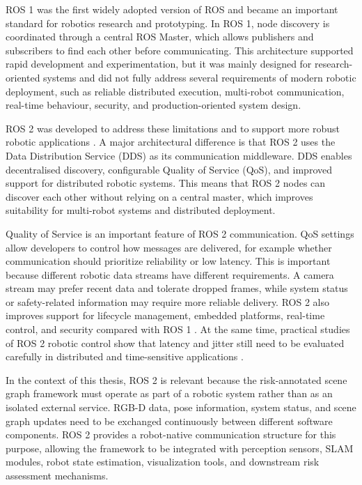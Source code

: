 {\small

ROS 1 was the first widely adopted version of ROS and became an important standard for robotics research and prototyping. In ROS 1, node discovery is coordinated through a central ROS Master, which allows publishers and subscribers to find each other before communicating. This architecture supported rapid development and experimentation, but it was mainly designed for research-oriented systems and did not fully address several requirements of modern robotic deployment, such as reliable distributed execution, multi-robot communication, real-time behaviour, security, and production-oriented system design.

ROS 2 was developed to address these limitations and to support more robust robotic applications \cite{macenski2022ros2}. A major architectural difference is that ROS 2 uses the Data Distribution Service (DDS) as its communication middleware. DDS enables decentralised discovery, configurable Quality of Service (QoS), and improved support for distributed robotic systems. This means that ROS 2 nodes can discover each other without relying on a central master, which improves suitability for multi-robot systems and distributed deployment.

Quality of Service is an important feature of ROS 2 communication. QoS settings allow developers to control how messages are delivered, for example whether communication should prioritize reliability or low latency. This is important because different robotic data streams have different requirements. A camera stream may prefer recent data and tolerate dropped frames, while system status or safety-related information may require more reliable delivery. ROS 2 also improves support for lifecycle management, embedded platforms, real-time control, and security compared with ROS 1 \cite{macenski2022ros2}. At the same time, practical studies of ROS 2 robotic control show that latency and jitter still need to be evaluated carefully in distributed and time-sensitive applications \cite{puck2021ros2realtime}.

In the context of this thesis, ROS 2 is relevant because the risk-annotated scene graph framework must operate as part of a robotic system rather than as an isolated external service. RGB-D data, pose information, system status, and scene graph updates need to be exchanged continuously between different software components. ROS 2 provides a robot-native communication structure for this purpose, allowing the framework to be integrated with perception sensors, SLAM modules, robot state estimation, visualization tools, and downstream risk assessment mechanisms.

}
















